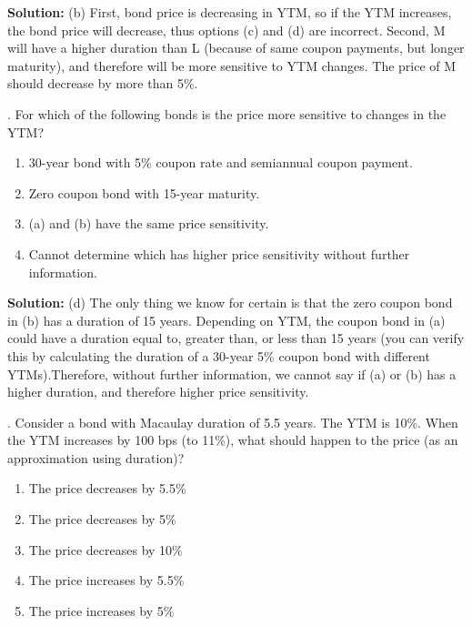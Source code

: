 \documentclass[11.5pt]{article}
\begin{document}
\noindent \textbf{Solution:} (b) First, bond price is decreasing in YTM, so if the YTM increases, the bond price will decrease, thus options (c) and (d) are incorrect. Second, M will have a higher duration than L (because of same coupon payments, but longer maturity), and therefore will be more sensitive to YTM changes. The price of M should decrease by more than 5\%.

\vspace{30pt}






. For which of the following bonds is the price more sensitive to changes in the YTM?


\begin{enumerate}[a]
	
	\item 30-year bond with 5\% coupon rate and semiannual coupon payment.
	
	\item Zero coupon bond with 15-year maturity.
	
	\item (a) and (b) have the same price sensitivity.
	
	\item Cannot determine which has higher price sensitivity without further information.
\end{enumerate}


\noindent \textbf{Solution:} (d) The only thing we know for certain is that the zero coupon bond in (b) has a duration of 15 years. Depending on YTM, the coupon bond in (a) could have a duration equal to, greater than, or less than 15 years (you can verify this by calculating the duration of a 30-year 5\% coupon bond with different YTMs).Therefore, without further information, we cannot say if (a) or (b) has a higher duration, and therefore higher price sensitivity.

\vspace{30pt}


\newpage


. Consider a bond with Macaulay duration of 5.5 years. The YTM is 10\%. When the YTM increases by 100 bps (to 11\%), what should happen to the price (as an approximation using duration)?


\begin{enumerate}[a]
	
	\item The price decreases by 5.5\%
	
	\item The price decreases by 5\%
	
	\item The price decreases by 10\%
	
	\item The price increases by 5.5\%
	
	\item The price increases by 5\%
\end{enumerate}
\end{document}

